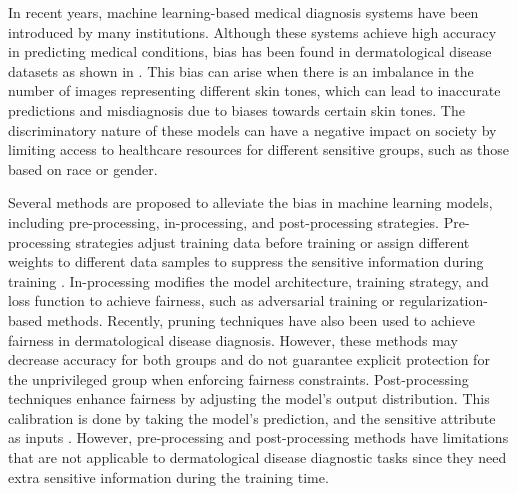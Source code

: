 In recent years, machine learning-based \cite{chen2020zero,chen2021one,chen2022representative,chen2021ct,wen2020noises} medical diagnosis systems have been introduced by many institutions. Although these systems achieve high accuracy in predicting medical conditions, bias has been found in dermatological disease datasets as shown in \cite{groh2021evaluating,kinyanjui2020fairness,tschandl2018ham10000}. This bias can arise when there is an imbalance in the number of images representing different skin tones, which can lead to inaccurate predictions and misdiagnosis due to biases towards certain skin tones. The discriminatory nature of these models can have a negative impact on society by limiting access to healthcare resources for different sensitive groups, such as those based on race or gender.


Several methods are proposed to alleviate the bias in machine learning models, including pre-processing, in-processing, and post-processing strategies. Pre-processing strategies adjust training data before training \cite{lu2020gender,ngxande2020bias} or assign different weights to different data samples to suppress the sensitive information during training \cite{kamiran2012data}. In-processing modifies the model architecture, training strategy, and loss function to achieve fairness, such as adversarial training \cite{alvi2018turning,zhang2018mitigating} or regularization-based \cite{jung2021fair,quadrianto2019discovering} methods. Recently, pruning \cite{wu2022fairprune} techniques have also been used to achieve fairness in dermatological disease diagnosis. However, these methods may decrease accuracy for both groups and do not guarantee explicit protection for the unprivileged group when enforcing fairness constraints. Post-processing techniques enhance fairness by adjusting the model's output distribution. This calibration is done by taking the model's prediction, and the sensitive attribute as inputs \cite{du2020fairness,hardt2016equality,zhao2017men}. However, pre-processing and post-processing methods have limitations that are not applicable to dermatological disease diagnostic tasks since they need extra sensitive information during the training time.
 

